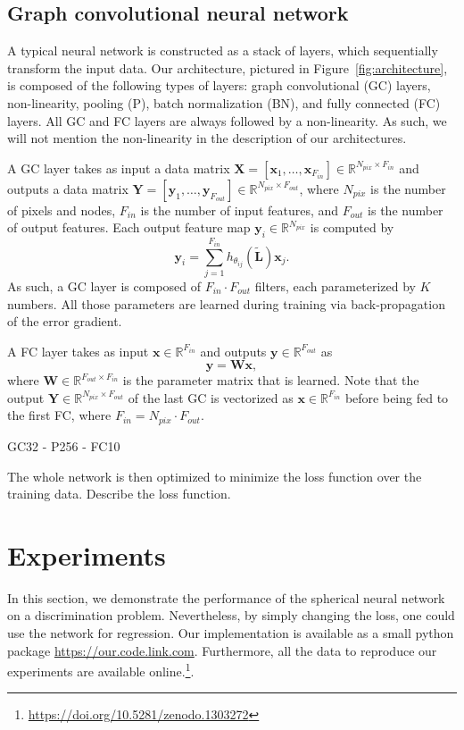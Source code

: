 \documentclass[final,twocolumn,3p,times,authoryear]{elsarticle}
\newcommand{\todo}[1]{{\color[rgb]{.6,.1,.6}{#1}}}
\newcommand{\figref}[1]{Figure~\ref{fig:#1}}
\renewcommand{\b}[1]{{\bm{#1}}}   %
\newcommand{\1}{\b{1}}              %
\newcommand{\0}{\b{0}}              %
\renewcommand{\L}{\b{L}}
\newcommand{\tL}{\tilde{\L}}
\newcommand{\W}{\b{W}}
\newcommand{\x}{\b{x}}
\newcommand{\X}{\b{X}}
\newcommand{\y}{\b{y}}
\newcommand{\Y}{\b{Y}}
\newcommand{\R}{\mathbb{R}}
\begin{document}
\subsection{Graph convolutional neural network}
\label{sec:architecture}

A typical neural network is constructed as a stack of layers, which sequentially transform the input data. Our architecture, pictured in \figref{architecture}, is composed of the following types of layers: graph convolutional (GC) layers, non-linearity, pooling (P), batch normalization (BN), and fully connected (FC) layers. All GC and FC layers are always followed by a non-linearity. As such, we will not mention the non-linearity in the description of our architectures.

A GC layer takes as input a data matrix $\X = [\x_1, \ldots, \x_{F_{in}}] \in \R^{N_{pix} \times F_{in}}$ and outputs a data matrix $\Y = [\y_1, \ldots, \y_{F_{out}}] \in \R^{N_{pix} \times F_{out}}$, where $N_{pix}$ is the number of pixels and nodes, $F_{in}$ is the number of input features, and $F_{out}$ is the number of output features. Each output feature map $\y_i \in \R^{N_{pix}}$ is computed by
\begin{equation*}
	\y_i = \sum_{j=1}^{F_{in}} h_{\theta_{ij}}(\tL) \x_j.
\end{equation*}
As such, a GC layer is composed of $F_{in} \cdot F_{out}$ filters, each parameterized by $K$ numbers. All those parameters are learned during training via back-propagation of the error gradient.

A FC layer takes as input $\x \in \R^{F_{in}}$ and outputs $\y \in \R^{F_{out}}$ as
\begin{equation*}
	\y = \b W \x,
\end{equation*}
where $\W \in \R^{F_{out} \times F_{in}}$ is the parameter matrix that is learned.
Note that the output $\Y \in \R^{N_{pix} \times F_{out}}$ of the last GC is vectorized as $\x \in \R^{F_{in}}$ before being fed to the first FC, where $F_{in} = N_{pix} \cdot F_{out}$.

GC32 - P256 - FC10

The whole network is then optimized to minimize the loss function over the training data.
Describe the loss function.

\section{Experiments}
\label{sec:experiments}

In this section, we demonstrate the performance of the spherical neural network on a discrimination problem. Nevertheless, by simply changing the loss, one could use the network for regression.
Our implementation is available as a small python package \url{https://our.code.link.com}.
Furthermore, all the data to reproduce our experiments are available online.\footnote{\url{https://doi.org/10.5281/zenodo.1303272} \todo{Check DOI}}.
\end{document}
